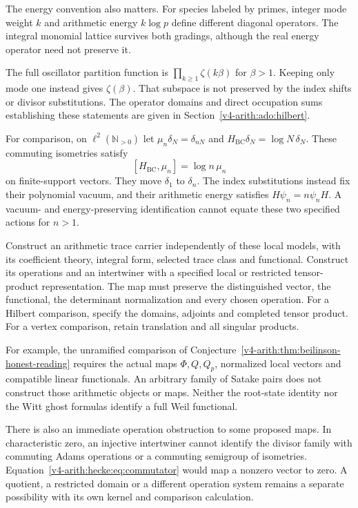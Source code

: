 The energy convention also matters.
For species labeled by primes, integer mode weight $k$ and
arithmetic energy $k\log p$ define different diagonal operators.
The integral monomial lattice survives both gradings,
although the real energy operator need not preserve it.

The full oscillator partition function is
$\prod_{k\geq1}\zeta(k\beta)$ for $\beta>1$.
Keeping only mode one instead gives $\zeta(\beta)$.
That subspace is not preserved by the index shifts or divisor substitutions.
The operator domains and direct occupation sums establishing these
statements are given in Section~\ref{v4-arith:ado:hilbert}.

For comparison, on $\ell^2(\mathbb N_{>0})$ let
$\mu_n\delta_N=\delta_{nN}$ and
$H_{\mathrm{BC}}\delta_N=\log N\,\delta_N$.
These commuting isometries satisfy
\[
 [H_{\mathrm{BC}},\mu_n]=\log n\,\mu_n
\]
on finite-support vectors.
They move $\delta_1$ to $\delta_n$.
The index substitutions instead fix their polynomial vacuum,
and their arithmetic energy satisfies $H\psi_n=n\psi_nH$.
A vacuum- and energy-preserving identification cannot equate these
two specified actions for $n>1$.

\begin{question}
\label{v4-arith:hecke:qn:arithmetic}
Construct an arithmetic trace carrier independently of these local models,
with its coefficient theory, integral form, selected trace class and functional.
Construct its operations and an intertwiner with a specified local
or restricted tensor-product representation.
The map must preserve the distinguished vector, the functional,
the determinant normalization and every chosen operation.
For a Hilbert comparison, specify the domains, adjoints and completed tensor product.
For a vertex comparison, retain translation and all singular products.
\end{question}

For example, the unramified comparison of
Conjecture~\ref{v4-arith:thm:beilinson-honest-reading} requires the
actual maps $\Phi,Q,Q_p$, normalized local vectors and compatible
linear functionals. An arbitrary family of Satake pairs does not
construct those arithmetic objects or maps.
Neither the root-state identity nor the Witt ghost formulas identify
a full Weil functional.

There is also an immediate operation obstruction to some proposed maps.
In characteristic zero, an injective intertwiner cannot identify
the divisor family with commuting Adams operations or a commuting
semigroup of isometries.
Equation~\eqref{v4-arith:hecke:eq:commutator} would map a nonzero vector to zero.
A quotient, a restricted domain or a different operation system remains
a separate possibility with its own kernel and comparison calculation.
